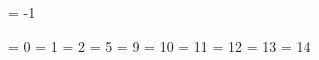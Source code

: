 \ifnocontextobject \scratchcounter \do \newcount  \scratchcounter \fi
\ifnocontextobject \scratchtoks    \do \newtoks   \scratchtoks    \fi
\ifnocontextobject \scratchdimen   \do \newdimen  \scratchdimen   \fi
\ifnocontextobject \scratchskip    \do \newskip   \scratchskip    \fi
\ifnocontextobject \scratchmuskip  \do \newmuskip \scratchmuskip  \fi
\ifnocontextobject \scratchbox     \do \newbox    \scratchbox     \fi
\ifnocontextobject \scratchread    \do \newread   \scratchread    \fi
\ifnocontextobject \scratchwrite   \do \newwrite  \scratchwrite   \fi

\ifnocontextobject \zeropoint      \do \newdimen  \zeropoint      \fi
\ifnocontextobject \zerocount      \do \chardef   {}    \fi
\ifnocontextobject \plusone        \do \chardef   {}    \fi
\ifnocontextobject \minusone       \do \newcount  \minusone       \fi

\ifnocontextobject \thousandpoint  \do \newdimen  \thousandpoint  \fi

\thousandpoint=1000pt 
\minusone     = -1 

\ifnocontextobject \emptytoks      \do \newtoks   \emptytoks      \fi

\ifnocontextobject \nextbox   \do \newbox   \nextbox   \fi
\ifnocontextobject \nextdepth \do \newdimen \nextdepth \fi

\ifnocontextobject \CONTEXTtrue            \do \newif\ifCONTEXT            \fi
\ifnocontextobject \donetrue               \do \newif\ifdone               \fi
\ifnocontextobject \eightbitcharacterstrue \do \newif\ifeightbitcharacters \fi
\ifnocontextobject \MPdrawingdonetrue      \do \newif\ifMPdrawingdone      \fi

\ifnocontextobject \ifzeropt               \do \let\ifzeropt\ifcase        \fi


\ifnocontextobject \@@escape     \do \chardef\@@escape     =  0 \fi
\ifnocontextobject \@@begingroup \do \chardef\@@begingroup =  1 \fi
\ifnocontextobject \@@endgroup   \do \chardef\@@endgroup   =  2 \fi
\ifnocontextobject \@@endofline  \do \chardef\@@endofline  =  5 \fi
\ifnocontextobject \@@ignore     \do \chardef\@@ignore     =  9 \fi
\ifnocontextobject \@@space      \do \chardef\@@space      = 10 \fi
\ifnocontextobject \@@letter     \do \chardef\@@letter     = 11 \fi
\ifnocontextobject \@@other      \do \chardef\@@other      = 12 \fi
\ifnocontextobject \@@active     \do \chardef\@@active     = 13 \fi
\ifnocontextobject \@@comment    \do \chardef\@@comment    = 14 \fi

